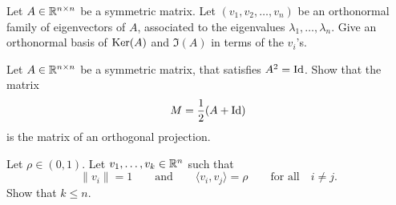 \documentclass[11pt,nocut]{article}
\begin{document}
\vspace{0.2cm}
\begin{problem}
	Let $A\in \mathbb{R}^{n \times n}$ be a symmetric matrix.
	Let $(v_1,v_2, \dots, v_n)$ be an orthonormal family of eigenvectors of $A$, associated to the eigenvalues $\lambda_1, \dots, \lambda_n$. Give an orthonormal basis of ${{\rm Ker}}(A)$ and $\Im(A)$ in terms of the $v_i$'s.
\end{problem}
\vspace{0.2cm}
\begin{problem}
	Let $A\in \mathbb{R}^{n \times n}$ be a symmetric matrix, that satisfies $A^2 = {{\rm Id}}$.
	Show that the matrix 
	$$
	M = \frac{1}{2}(A+{{\rm Id}})
	$$
	is the matrix of an orthogonal projection.
\end{problem}
\vspace{0.2cm}
\begin{problem}
	Let $\rho \in (0,1)$.
	Let $v_1, \dots, v_k \in \mathbb{R}^n$ such that
	$$
\|v_i\| = 1
\qquad \text{and} \qquad
\langle v_i, v_j \rangle = \rho
\qquad \text{for all} \quad i \neq j.
	$$
	Show that $k \leq n$.
\end{problem}
\vspace{1cm}
\centerline{}

%
%
\end{document}
